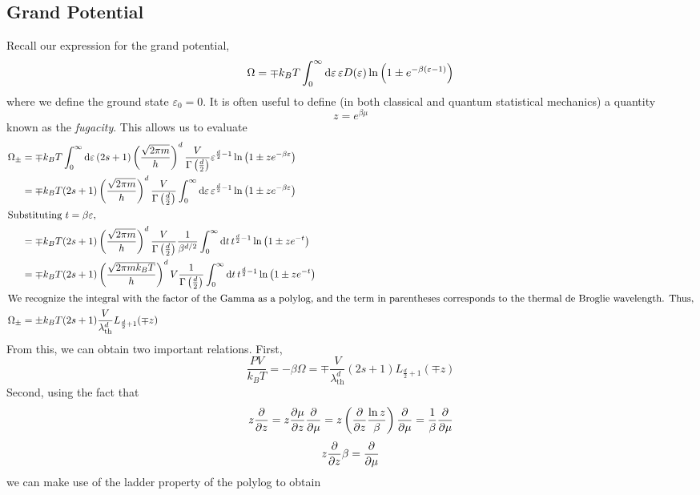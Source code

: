 \subsection{Grand Potential}
Recall our expression for the grand potential,
\[\Omega = \mp k_BT\int_0^\infty \d{\varepsilon} \varepsilon D(\varepsilon) \ln\left(1\pm e^{-\beta(\varepsilon-1)}\right)\]
where we define the ground state \(\varepsilon_0 = 0\). It is often useful to define (in both classical and quantum statistical mechanics) a quantity
\begin{equation}
	z = e^{\beta\mu}
\end{equation}
known as the \emph{fugacity}. This allows us to evaluate
\begin{align}
	\Omega_\pm &= \mp k_BT\int_0^\infty\d{\varepsilon} (2s+1)\left(\frac{\sqrt{2\pi m}}{h}\right)^d\frac{V}{\Gamma\left(\tfrac{d}{2}\right)}\varepsilon^{\frac{d}{2}-1}\ln \left(1\pm ze^{-\beta \varepsilon}\right)\nonumber\\
		   &= \mp k_BT (2s+1)\left(\frac{\sqrt{2\pi m}}{h}\right)^d\frac{V}{\Gamma\left(\tfrac{d}{2}\right)}\int_0^\infty\d{\varepsilon}\varepsilon^{\frac{d}{2}-1}\ln \left(1\pm ze^{-\beta \varepsilon}\right)\nonumber\\
		   \intertext{Substituting \(t = \beta\varepsilon\),}
		   &= \mp k_BT (2s+1)\left(\frac{\sqrt{2\pi m}}{h}\right)^d\frac{V}{\Gamma\left(\tfrac{d}{2}\right)}\frac{1}{\beta^{d/2}}\int_0^\infty\d{t}t^{\frac{d}{2}-1}\ln \left(1\pm ze^{-t}\right)\nonumber\\
		   &= \mp k_BT (2s+1)\left(\frac{\sqrt{2\pi mk_BT}}{h}\right)^d V\frac{1}{\Gamma\left(\tfrac{d}{2}\right)}\int_0^\infty\d{t}t^{\frac{d}{2}-1}\ln \left(1\pm ze^{-t}\right)\nonumber\\
		   \intertext{We recognize the integral with the factor of the Gamma as a polylog, and the term in parentheses corresponds to the thermal de Broglie wavelength. Thus,}
	\Omega_\pm &= \pm k_BT(2s+1)\frac{V}{\lambda_{\text{th}}^d} L_{\frac{d}{2}+1}(\mp z)\label{eq26:qiggp}
\end{align}
From this, we can obtain two important relations. First,
\begin{equation}\frac{PV}{k_BT} = -\beta \Omega = \mp \frac{V}{\lambda_{\text{th}}^d}(2s+1)L_{\frac{d}{2}+1}(\mp z)\end{equation}
Second, using the fact that
\[z\frac{\partial }{\partial z} = z\frac{\partial \mu}{\partial z}\frac{\partial }{\partial \mu} = z\left(\frac{\partial }{\partial z}\frac{\ln z}{\beta}\right)\frac{\partial }{\partial \mu} = \frac{1}{\beta} \frac{\partial }{\partial \mu}\]
\[z\frac{\partial }{\partial z}\beta = \frac{\partial }{\partial \mu}\]
we can make use of the ladder property of the polylog to obtain
